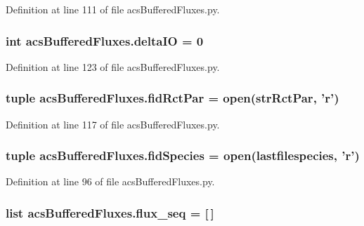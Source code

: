 Definition at line 111 of file acs\-Buffered\-Fluxes.\-py.

\hypertarget{a00092_ae908941897ea01dca9c2be46363f1845}{
\subsubsection[{delta\-I\-O}]{\setlength{\rightskip}{0pt plus 5cm}int acs\-Buffered\-Fluxes.\-delta\-I\-O = 0}}\label{a00092_ae908941897ea01dca9c2be46363f1845}


Definition at line 123 of file acs\-Buffered\-Fluxes.\-py.

\hypertarget{a00092_af949c46aab0625cd7bbed10b8a484f8b}{
\subsubsection[{fid\-Rct\-Par}]{\setlength{\rightskip}{0pt plus 5cm}tuple acs\-Buffered\-Fluxes.\-fid\-Rct\-Par = open({\bf str\-Rct\-Par}, '{\bf r}')}}\label{a00092_af949c46aab0625cd7bbed10b8a484f8b}


Definition at line 117 of file acs\-Buffered\-Fluxes.\-py.

\hypertarget{a00092_ad38778cd180f00344e8a8d68511f56fd}{
\subsubsection[{fid\-Species}]{\setlength{\rightskip}{0pt plus 5cm}tuple acs\-Buffered\-Fluxes.\-fid\-Species = open({\bf lastfilespecies}, '{\bf r}')}}\label{a00092_ad38778cd180f00344e8a8d68511f56fd}


Definition at line 96 of file acs\-Buffered\-Fluxes.\-py.

\hypertarget{a00092_a99cfaccf97d11133896704acd137057d}{
\subsubsection[{flux\-\_\-seq}]{\setlength{\rightskip}{0pt plus 5cm}list acs\-Buffered\-Fluxes.\-flux\-\_\-seq = \mbox{[}$\,$\mbox{]}}}\label{a00092_a99cfaccf97d11133896704acd137057d}


